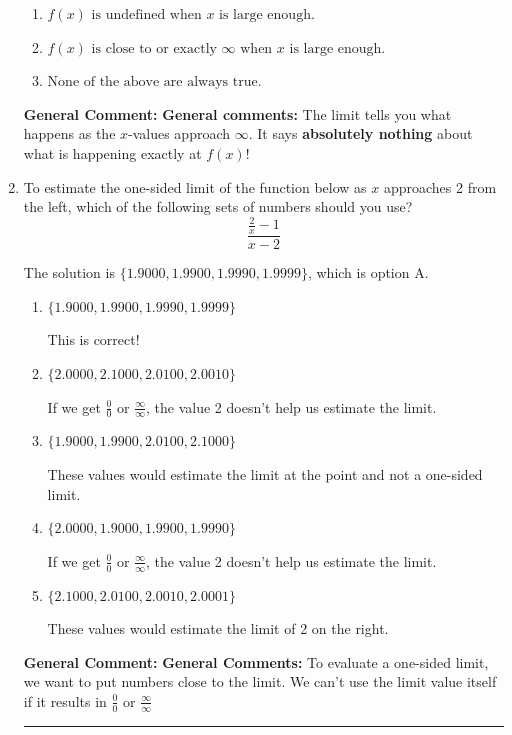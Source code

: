 \documentclass{extbook}[14pt]
\newcommand{\litem}[1]{\item #1

\rule{\textwidth}{0.4pt}}
\begin{document}
\begin{enumerate}
{\begin{enumerate}[label=\Alph*.]
\item \( f(x) \text{ is undefined when } x \text{ is large enough}. \)


\item \( f(x) \text{ is close to or exactly } \infty \text{ when } x \text{ is large enough}. \)


\item \( \text{None of the above are always true.} \)


\end{enumerate}

\textbf{General Comment:} \textbf{General comments:} The limit tells you what happens as the $x$-values approach $\infty$. It says \textbf{absolutely nothing} about what is happening exactly at $f(x)$!
}
\litem{
To estimate the one-sided limit of the function below as $x$ approaches 2 from the left, which of the following sets of numbers should you use?
\[ \frac{\frac{2}{x} - 1}{x - 2} \]

The solution is \( \{ 1.9000, 1.9900, 1.9990, 1.9999 \} \), which is option A.\begin{enumerate}[label=\Alph*.]
\item \( \{ 1.9000, 1.9900, 1.9990, 1.9999 \} \)

This is correct!
\item \( \{ 2.0000, 2.1000, 2.0100, 2.0010 \} \)

If we get $\frac{0}{0}$ or $\frac{\infty}{\infty}$, the value 2 doesn't help us estimate the limit.
\item \( \{ 1.9000, 1.9900, 2.0100, 2.1000 \} \)

These values would estimate the limit at the point and not a one-sided limit.
\item \( \{ 2.0000, 1.9000, 1.9900, 1.9990 \} \)

If we get $\frac{0}{0}$ or $\frac{\infty}{\infty}$, the value 2 doesn't help us estimate the limit.
\item \( \{ 2.1000, 2.0100, 2.0010, 2.0001 \} \)

These values would estimate the limit of 2 on the right.
\end{enumerate}

\textbf{General Comment:} \textbf{General Comments:} To evaluate a one-sided limit, we want to put numbers close to the limit. We can't use the limit value itself if it results in $\frac{0}{0}$ or $\frac{\infty}{\infty}$
}
\end{enumerate}
\end{document}
